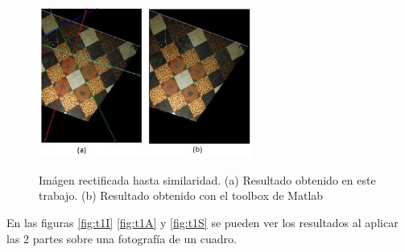 \documentclass{IEEEtran}
\begin{document}
\begin{figure}[H]
\caption{Imágen rectificada hasta similaridad. (a) Resultado obtenido
en este trabajo. (b) Resultado obtenido con el toolbox de Matlab}
\centering
\includegraphics[width=7cm,natwidth=388,natheight=276]{imgs/cvM.jpg}
\label{fig:fsImg}
\end{figure} 

En las figuras \ref{fig:t1I} \ref{fig:t1A} y \ref{fig:t1S} se pueden ver los resultados al
aplicar las 2 partes sobre una fotografía de un cuadro.
\end{document}
